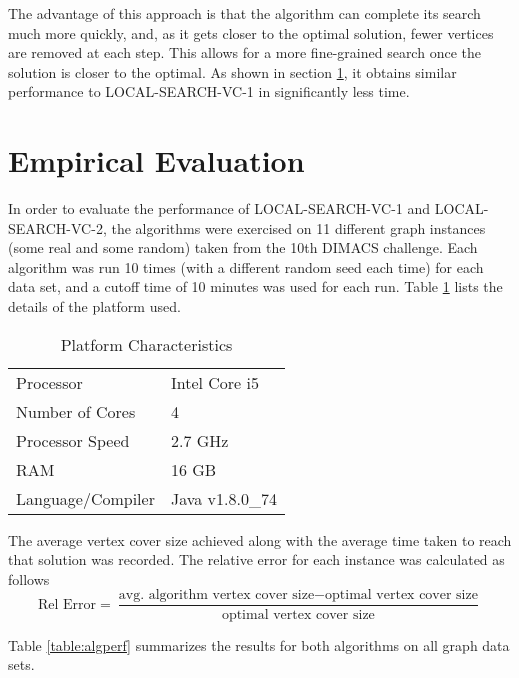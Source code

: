 \documentclass[sigconf]{acmart}
\begin{document}
The advantage of this approach is that the algorithm can complete its search much more quickly, and, as it gets closer to the optimal solution, fewer vertices are removed at each step. This allows for a more fine-grained search once the solution is closer to the optimal. As shown in section \ref{sec:eval}, it obtains similar performance to LOCAL-SEARCH-VC-1 in significantly less time.

\section{Empirical Evaluation} \label{sec:eval}
In order to evaluate the performance of LOCAL-SEARCH-VC-1 and LOCAL-SEARCH-VC-2, the algorithms were exercised on 11 different graph instances (some real and some random) taken from the 10th DIMACS challenge. 
Each algorithm was run 10 times (with a different random seed each time) for each data set, and a cutoff time of 10 minutes was used for each run. Table \ref{table:platfm} lists the details of the platform used.
\begin{table}[h]
	\caption{Platform Characteristics}
	\label{table:platfm}
	\begin{tabular}{ll}
		\toprule
		Processor    		&	Intel Core i5 	\\
		Number of Cores		&	4				\\
		Processor Speed 	&	2.7 GHz			\\
		RAM					&	16 GB			\\
		Language/Compiler	&	Java v1.8.0\_74	\\
		\bottomrule
	\end{tabular}
\end{table}

The average vertex cover size achieved along with the average time taken to reach that solution was recorded. The relative error for each instance was calculated as follows
\begin{equation*}
	\textrm{Rel Error} = \frac{\textrm{avg. algorithm vertex cover size} - \textrm{optimal vertex cover size}}{\textrm{optimal vertex cover size}}
\end{equation*} 

Table \ref{table:algperf} summarizes the results for both algorithms on all graph data sets.
\end{document}
